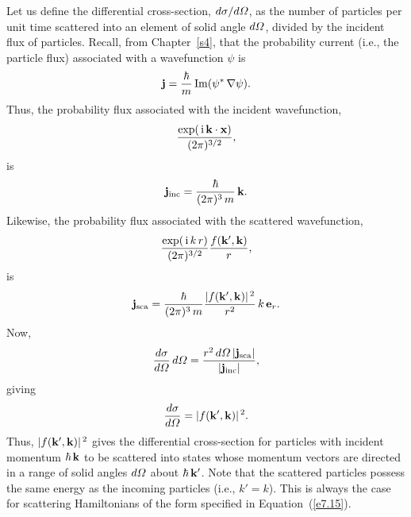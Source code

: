 Let us define the differential cross-section, $d\sigma/d{\mit\Omega}$, as
the number of particles per unit time scattered into an element of
solid angle $d{\mit\Omega}$, divided by the incident flux of particles. 
Recall, from Chapter~\ref{s4}, that the probability current 
({\rm i.e.}, the particle flux) associated with a
wavefunction $\psi$ is
\begin{equation}
{\bf j} = \frac{\hbar}{m}\, {\rm Im}(\psi^\ast\, \nabla \psi).
\end{equation}
Thus, the probability flux associated with the incident wavefunction,
\begin{equation}
\frac{ \exp(\,{\rm i} \,{\bf k}\cdot {\bf x})}{(2\pi)^{3/2}},
\end{equation}
is
\begin{equation}
{\bf j}_{\rm inc} = \frac{\hbar}{(2\pi)^{3}\,m} \,{\bf k}.
\end{equation}
Likewise, the probability flux associated with the scattered wavefunction,
\begin{equation}
\frac{ \exp(\,{\rm i} \,k\,r)}{(2\pi)^{3/2}}\frac{
 f({\bf k}', {\bf k})}{r},
\end{equation}
 is
\begin{equation}
{\bf j}_{\rm sca}=\frac{\hbar}{(2\pi)^{3}\,m}
\frac{|f( {\bf k}', {\bf k})|^{\,2}}{r^2} \, k\, {\bf e}_r.
\end{equation}
Now,
\begin{equation}
\frac{d\sigma}{d {\mit\Omega}} \,d{\mit\Omega}  = 
\frac{ r^2\,d{\mit\Omega} \, |{\bf j}_{\rm sca}|}{|{\bf j}_{\rm inc}|},
\end{equation}
giving
\begin{equation}\label{e7.33}
\frac{d\sigma}{d {\mit\Omega}} = |f({\bf k}', {\bf k})|^{\,2}.
\end{equation}
Thus, $|f({\bf k}', {\bf k})|^{\,2}$ gives the differential cross-section for particles with incident momentum $\hbar\,{ \bf k}$ to be scattered
into states whose momentum vectors are directed in a range of solid angles
$d{\mit\Omega}$ about $\hbar\,{ \bf k}'$. Note that the scattered particles possess
the same energy as the incoming particles ({\rm i.e.}, $k'=k$). This is always
the case for scattering Hamiltonians of the form specified in Equation~(\ref{e7.15}). 

